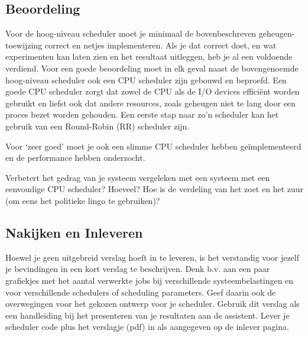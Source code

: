 \documentclass[11pt,a4paper,twoside]{article}
\begin{document}
\subsection*{Beoordeling}
Voor de hoog-niveau scheduler moet je minimaal de bovenbeschreven
geheugen-toewijzing correct en netjes implementeren. Als je dat correct doet, en wat experimenten
kan laten zien en het resultaat uitleggen, heb je al een voldoende verdiend.\newline
Voor een goede beoordeling moet in elk geval naast de bovengenoemde hoog-niveau scheduler ook een
CPU scheduler zijn gebouwd en beproefd.
Een goede CPU scheduler zorgt dat zowel de CPU als de I/O devices effici\"ent worden gebruikt en
liefst ook dat andere resources, zoals geheugen niet te lang door een proces bezet worden gehouden.
Een eerste stap naar zo'n scheduler kan het gebruik van een Round-Robin (RR) scheduler zijn.

Voor `zeer goed' moet je ook een slimme CPU scheduler hebben ge\"{i}mplementeerd en de performance
hebben onderzocht.

Verbetert het gedrag van je systeem vergeleken met een systeem met een
eenvoudige CPU scheduler? Hoeveel? Hoe is de verdeling van
het zoet en het zuur (om eens het politieke lingo te gebruiken)?


\subsection*{Nakijken en Inleveren}

Hoewel je geen uitgebreid verslag hoeft in te leveren, is het verstandig voor jezelf je bevindingen in een kort verslag te beschrijven.
Denk b.v. aan een paar grafiekjes met het aantal verwerkte jobs bij verschillende systeembelastingen en voor verschillende schedulers of scheduling parameters.
Geef daarin ook de overwegingen voor het gekozen ontwerp voor je scheduler. Gebruik dit verslag
als een handleiding bij het presenteren van je resultaten aan de assistent.
Lever je scheduler code plus het verslagje (pdf) in als aangegeven op de inlever pagina. 
  
\end{document}
